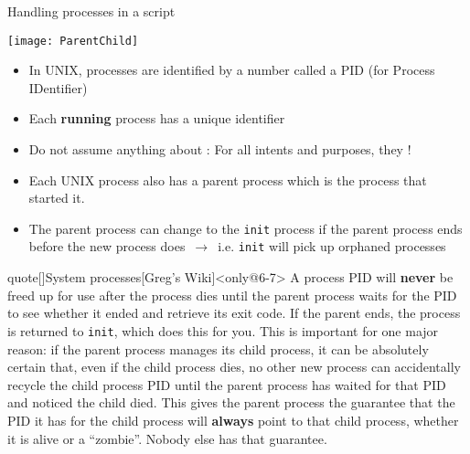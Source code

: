 \begin{frame}{Handling processes in a script}
\begin{overlayarea}{\textwidth}{0.7\textheight}
\begin{onlyenv}
\begin{itemize}
                         \centerline{\texttt{[image: ParentChild]}}
            \end{itemize}
        \end{onlyenv}
        \begin{itemize}[<only@5->]
            \item In UNIX, processes are identified by a number called a PID (for Process IDentifier)
            \item Each \textbf{running} process has a unique identifier
            \item Do not assume anything about : For all intents and purposes, they !
            \item Each UNIX process also has a parent process which is the process that started it.
            \item The parent process can change to the \texttt{init} process if the parent process ends before the new process does \,$\to$\, i.e. \texttt{init} will pick up orphaned processes
        \end{itemize}
        \vspace{-2mm}
        \begin{varblock}{quote}[\textwidth]{System processes}[Greg's Wiki]<only@6-7>
            A process PID will \textbf{never} be freed up for use after the process dies until the parent process waits for the PID to see whether it ended and retrieve its exit code.
            If the parent ends, the process is returned to \textnormal{\texttt{init}}, which does this for you.
            This is important for one major reason: \alert{if the parent process manages its child process, it can be absolutely certain that, even if the child process dies, no other new process can accidentally recycle the child process PID until the parent process has waited for that PID and noticed the child died}.
            This gives the parent process the guarantee that the PID it has for the child process will \textbf{always} point to that child process, whether it is alive or a ``zombie''.
            Nobody else has that guarantee.
        \end{varblock}

\end{overlayarea}
\end{frame}
